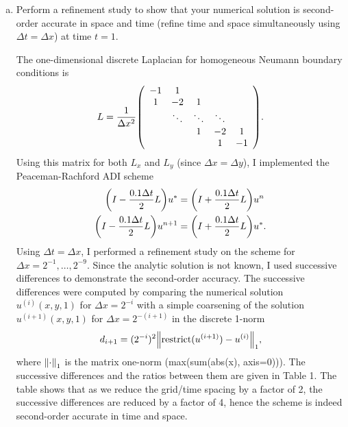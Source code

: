 \documentclass[12pt]{article}
\begin{document}
\begin{enumerate}[(a)]
\item Perform a refinement study to show that your numerical solution is second-order accurate in space and time (refine time and space simultaneously using $\Delta t = \Delta x$) at time $t=1$.

The one-dimensional discrete Laplacian for homogeneous Neumann boundary conditions is 
$$L = \dfrac{1}{\Delta x^2}\qty(\begin{array}{cccccc}
-1 & 1 &  & & \\
1 & -2 & 1 &  & \\
& \ddots & \ddots & \ddots & \\
& & 1 & -2 & 1 \\
& & & 1 & -1 \\
\end{array}).$$
Using this matrix for both $L_x$ and $L_y$ (since $\Delta x = \Delta y$), I implemented the Peaceman-Rachford ADI scheme
\begin{align*}
\qty(I - \dfrac{0.1 \Delta t}{2} L)u^* &= \qty(I + \dfrac{0.1 \Delta t}{2}L)u^n \\
\qty(I - \dfrac{0.1 \Delta t}{2} L)u^{n+1} &= \qty(I + \dfrac{0.1 \Delta t}{2}L)u^*.
\end{align*}
Using $\Delta t = \Delta x$, I performed a refinement study on the scheme for $\Delta x = 2^{-1}, \dots, 2^{-9}$.  Since the analytic solution is not known, I used successive differences to demonstrate the second-order accuracy. The successive differences were computed by comparing the numerical solution $u^{(i)}(x,y,1)$ for $\Delta x = 2^{-i}$ with a simple coarsening of the solution $u^{(i+1)}(x,y,1)$ for $\Delta x = 2^{-(i+1)}$ in the discrete 1-norm
$$d_{i+1} = (2^{-i})^2 \norm{\text{restrict}(u^{(i+1)}) - u^{(i)}}_1, $$
where $\norm{\cdot}_1$ is the matrix one-norm (max(sum(abs(x), axis=0))).
The successive differences and the ratios between them are given in Table 1.  The table shows that as we reduce the grid/time spacing by a factor of 2, the successive differences are reduced by a factor of 4, hence the scheme is indeed second-order accurate in time and space.


\end{enumerate}
\end{document}
